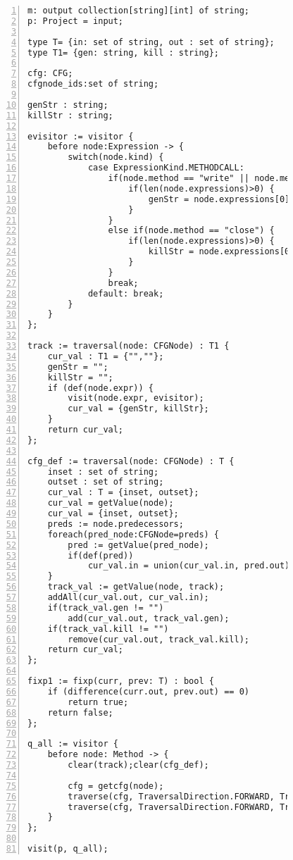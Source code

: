 \begin{figure}[ht!]
\begin{lstlisting}[numbers=left, tabsize=4, escapechar=@, caption={Resource status},label={lst:rs-code}, lastline = 59] 
m: output collection[string][int] of string;
p: Project = input;

type T= {in: set of string, out : set of string};
type T1= {gen: string, kill : string};

cfg: CFG;
cfgnode_ids:set of string;

genStr : string;
killStr : string; 

evisitor := visitor {
	before node:Expression -> {
		switch(node.kind) {
			case ExpressionKind.METHODCALL: 
				if(node.method == "write" || node.method == "read" || node.method == "open") {
					if(len(node.expressions)>0) {
						genStr = node.expressions[0].variable;
					}
				}
				else if(node.method == "close") {
					if(len(node.expressions)>0) {
						killStr = node.expressions[0].variable;
					}
				}
  				break;
			default: break;
		}
	}
};

track := traversal(node: CFGNode) : T1 {
	cur_val : T1 = {"",""};
	genStr = "";
	killStr = "";
	if (def(node.expr)) {
		visit(node.expr, evisitor);
		cur_val = {genStr, killStr};
	}
	return cur_val;
};

cfg_def := traversal(node: CFGNode) : T {
	inset : set of string;
	outset : set of string;
	cur_val : T = {inset, outset};
	cur_val = getValue(node);
	cur_val = {inset, outset};
	preds := node.predecessors;
	foreach(pred_node:CFGNode=preds) {
		pred := getValue(pred_node);
		if(def(pred))
			cur_val.in = union(cur_val.in, pred.out);
	}
	track_val := getValue(node, track);
	addAll(cur_val.out, cur_val.in);
	if(track_val.gen != "")
		add(cur_val.out, track_val.gen);
	if(track_val.kill != "")
		remove(cur_val.out, track_val.kill);
	return cur_val;
};

fixp1 := fixp(curr, prev: T) : bool {
	if (difference(curr.out, prev.out) == 0)
		return true;	
	return false;
};

q_all := visitor {
	before node: Method -> {
		clear(track);clear(cfg_def);

		cfg = getcfg(node);
		traverse(cfg, TraversalDirection.FORWARD, TraversalKind.HYBRID, track);
		traverse(cfg, TraversalDirection.FORWARD, TraversalKind.HYBRID, cfg_def, fixp1);
	}
};

visit(p, q_all);
\end{lstlisting}
\end{figure}